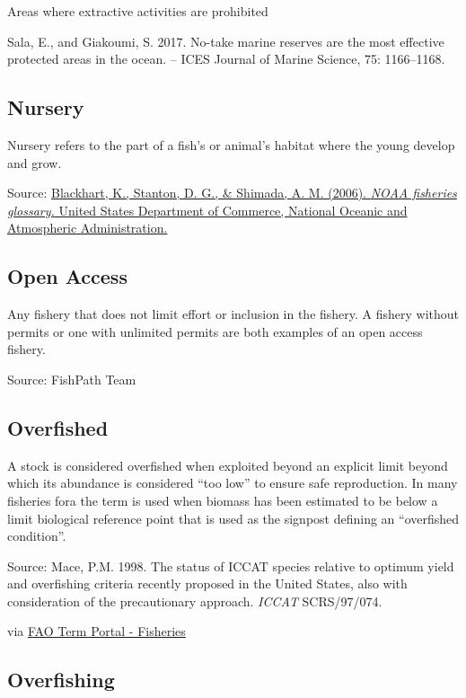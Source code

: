 \documentclass[
  11pt,
]{book}
\begin{document}
Areas where extractive activities are prohibited

Sala, E., and Giakoumi, S. 2017. No-take marine reserves are the most effective protected areas in the ocean. -- ICES Journal of Marine Science, 75: 1166--1168.

\hypertarget{nursery}{%
\subsection{Nursery}\label{nursery}}

Nursery refers to the part of a fish's or animal's habitat where the young develop and grow.

Source: \href{https://repository.library.noaa.gov/view/noaa/12856}{Blackhart, K., Stanton, D. G., \& Shimada, A. M. (2006). \emph{NOAA fisheries glossary.} United States Department of Commerce, National Oceanic and Atmospheric Administration.}

\hypertarget{open-access}{%
\subsection{Open Access}\label{open-access}}

Any fishery that does not limit effort or inclusion in the fishery. A fishery without permits or one with unlimited permits are both examples of an open access fishery.

Source: FishPath Team

\hypertarget{overfished}{%
\subsection{Overfished}\label{overfished}}

A stock is considered overfished when exploited beyond an explicit limit beyond which its abundance is considered ``too low'' to ensure safe reproduction. In many fisheries fora the term is used when biomass has been estimated to be below a limit biological reference point that is used as the signpost defining an ``overfished condition''.

Source: Mace, P.M. 1998. The status of ICCAT species relative to optimum yield and overfishing criteria recently proposed in the United States, also with consideration of the precautionary approach. \emph{ICCAT} SCRS/97/074.

via \href{http://www.fao.org/fishery/glossary/en}{FAO Term Portal - Fisheries}

\hypertarget{overfishing}{%
\subsection{Overfishing}\label{overfishing}}
\end{document}
